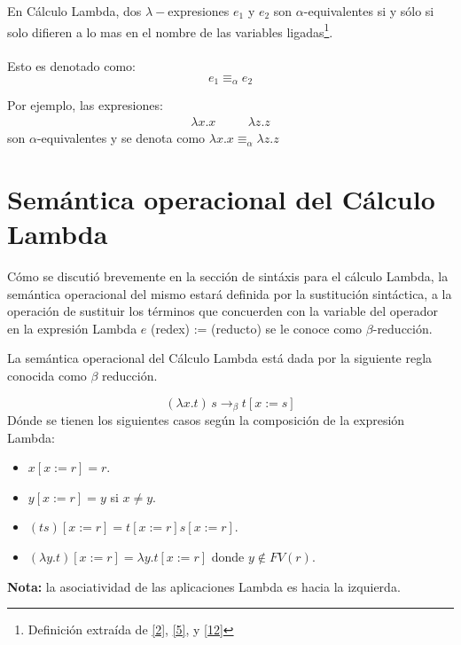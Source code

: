 \bigskip

    \begin{definition} En Cálculo Lambda, dos $\lambda-$expresiones $e_1$ y $e_2$ son $\alpha$-equivalentes si y sólo si solo difieren a lo mas en el nombre de las variables ligadas\footnote{Definición extraída de \hyperlink{2}{[2]},  \hyperlink{5}{[5]},  y  \hyperlink{12}{[12]}}.\\\\
    Esto es denotado como: $$e_1 \equiv_{\alpha} e_2 $$
    \end{definition}

     Por ejemplo, las expresiones:
    \[
        \begin{array}{ccc}
        \lambda x.x &\quad& \lambda z.z
        \end{array}
    \]
    \noindent
    son $\alpha$-equivalentes y se denota como $\lambda x.x\equiv_{\alpha}\lambda z.z$

    \section{Semántica operacional del Cálculo Lambda}
    Cómo se discutió brevemente en la sección de sintáxis para el cálculo Lambda, la semántica operacional del mismo estará definida por la sustitución sintáctica, a la operación de sustituir los términos que concuerden con la variable del operador en la expresión Lambda $e$ (redex) := (reducto) se le conoce como $\beta$-reducción.

    \bigskip

    \begin{definition} La semántica operacional del Cálculo Lambda está dada por la siguiente regla conocida como $\beta$ reducción.

    $$(\lambda x.t)\,s \to_\beta t[x:=s]$$
    Dónde se tienen los siguientes casos según la composición de la expresión Lambda:
        \begin{itemize}
        \item $x[x:=r] = r$. 
        \item $y[x:=r] = y$ si $x\neq y$.
        \item $(ts)[x:=r] = t[x:=r]s[x:=r]$.
        \item $(\lambda y.t)[x:=r] = \lambda y.t[x:=r]$ donde $y\notin FV(r)$.
        \end{itemize}
        \textbf{Nota:} la asociatividad de las aplicaciones Lambda es hacia la izquierda.
    \end{definition}
    
